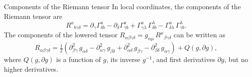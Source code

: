 




\begin{colorlem}{Components of the Riemann tensor}{}
In local coordinates, the components of the Riemann tensor are
\begin{equation}
    \label{eq:riemann-curvature-tensor-components1}
    R^a{}_{b\gamma\delta} = \partial_\gamma \Gamma^a_{\delta b} - \partial_\delta \Gamma^a_{\gamma b} + \Gamma^a_{\gamma\lambda}\,\Gamma^\lambda_{\delta b} - \Gamma^a_{\delta\lambda}\,\Gamma^\lambda_{\gamma b}.
\end{equation}
The components of the lowered tensor $R_{\alpha\beta\gamma\delta} = g_{\alpha\mu}\,R^\mu{}_{\beta\gamma\delta}$ can be written as
\begin{equation}
    \label{eq:riemann-curvature-tensor-components2}
    R_{\alpha\beta\gamma\delta} = \tfrac{1}{2}\left(\partial^2_{\beta\gamma}\,g_{\alpha\delta} - \partial^2_{\alpha\gamma}\,g_{\beta\delta} + \partial^2_{\alpha\delta}\,g_{\beta\gamma} - \partial^2_{\beta\delta}\,g_{\alpha\gamma}\right) + Q(g, \partial g),
\end{equation}
where $Q(g, \partial g)$ is a function of $g$, its inverse $g^{-1}$, and first derivatives $\partial g$, but no higher derivatives.
\end{colorlem}


